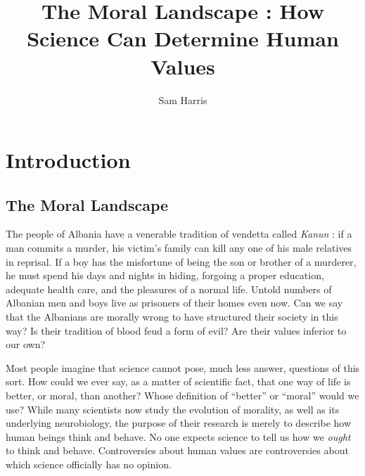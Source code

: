\documentclass[a4paper,14pt]{extbook}
\title{The Moral Landscape : How Science Can Determine Human Values}
\author{Sam Harris}
\begin{document}
\maketitle
\tableofcontents

\newpage
\section{Introduction}

\subsection{The Moral Landscape}

The people of Albania have a venerable tradition of vendetta called \textit{Kanun} :
if a man commits a murder, his victim's family can kill any one of his male relatives in reprisal.
If a boy has the misfortune of being the son or brother of a murderer, he must spend his days and nights in hiding, forgoing a proper education, adequate health care, and the pleasures of a normal life.
Untold numbers of Albanian men and boys live as prisoners of their homes even now.
Can we say that the Albanians are morally wrong to have structured their society in this way?
Is their tradition of blood feud a form of evil?
Are their values inferior to our own?

Most people imagine that science cannot pose, much less answer, questions of this sort.
How could we ever say, as a matter of scientific fact, that one way of life is better, or moral, than another?
Whose definition of ``better'' or ``moral'' would we use?
While many scientists now study the evolution of morality, as well as its underlying neurobiology, the purpose of their research is merely to describe how human beings think and behave.
No one expects science to tell us how we \textit{ought} to think and behave.
Controversies about human values are controversies about which science officially has no opinion.
\end{document}
